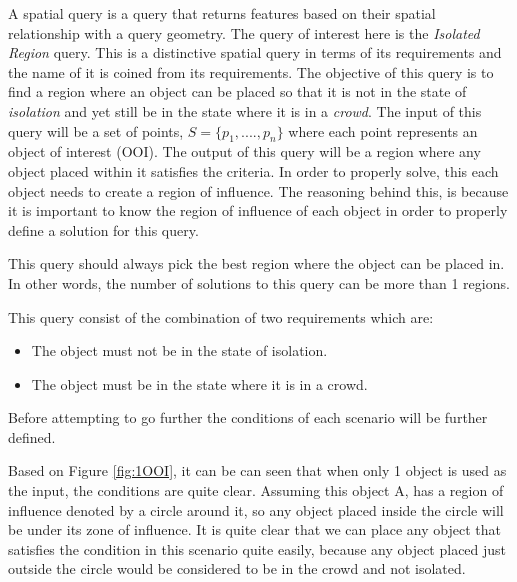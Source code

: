\documentclass[a4paper,11pt]{article}
\begin{document}
A spatial query is a query that returns features based on their spatial relationship with a query geometry. The query of interest here is the \textit{Isolated Region} query. This is a distinctive spatial query in terms of its requirements and the name of it is coined from its requirements. The objective of this query is to find a region where an object can be placed so that it is not in the state of \textit{isolation} and yet still be in the state where it is in a \textit{crowd}. The input of this query will be a set of points, $S = \{p_1,....,p_n\}$ where each point represents an object of interest (OOI). The output of this query will be a region where any object placed within it satisfies the criteria. In order to properly solve, this each object needs to create a region of influence. The reasoning behind this, is because it is important to know the region of influence of each object in order to properly define a solution for this query.

This query should always pick the best region where the object can be placed in. In other words, the number of solutions to this query can be more than 1 regions. 

This query consist of the combination of two requirements which are:
\begin{itemize}
	\item The object must not be in the state of isolation.
	\item The object must be in the state where it is in a crowd.
\end{itemize}

Before attempting to go further the conditions of each scenario will be further defined. 

Based on Figure \ref{fig:1OOI}, it can be can seen that when only 1 object is used as the input, the conditions are quite clear. Assuming this object A, has a region of influence denoted by a circle around it, so any object placed inside the circle will be under its zone of influence. It is quite clear that we can place any object that satisfies the condition in this scenario quite easily, because any object placed just outside the circle would be considered to be in the crowd and not isolated. 
\end{document}

